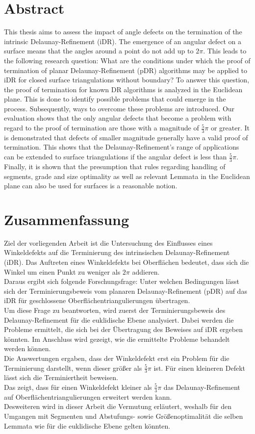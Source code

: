 \chapter*{Abstract}
This thesis aims to assess the impact of angle defects on the termination of the intrinsic Delaunay-Refinement (iDR). The emergence of an angular defect on a surface means that the angles around a point do not add up to $2\pi$. This leads to the following research question: What are the conditions under which the proof of termination of planar Delaunay-Refinement (pDR) algorithms may be applied to iDR for closed surface triangulations without boundary? To answer this question, the proof of termination for known DR algorithms is analyzed in the Euclidean plane. This is done to identify possible problems that could emerge in the process. Subsequently, ways to overcome these problems are introduced. Our evaluation shows that the only angular defects that become a problem with regard to the proof of termination are those with a magnitude of $\frac{5}{3}\pi$ or greater. It is demonstrated that defects of smaller magnitude generally have a valid proof of termination. This shows that the Delaunay-Refinement’s range of applications can be extended to surface triangulations if the angular defect is less than $\frac{5}{3}\pi$. Finally, it is shown that the presumption that rules regarding handling of segments, grade and size optimality as well as relevant Lemmata in the Euclidean plane can also be used for surfaces is a reasonable notion.

\chapter*{Zusammenfassung}
Ziel der vorliegenden Arbeit ist die Untersuchung des Einflusses eines Winkeldefekts auf die Terminierung des intrinsischen Delaunay-Refinement (iDR).  Das Auftreten eines Winkeldefekts bei Oberflächen bedeutet, dass sich die Winkel um einen Punkt zu weniger als  $2\pi$ addieren. \\
    Daraus ergibt sich folgende Forschungsfrage: Unter welchen Bedingungen lässt sich der Terminierungsbeweis vom planaren Delaunay-Refinement (pDR)  auf das iDR für geschlossene Oberflächentriangulierungen  übertragen.\\
    Um diese Frage zu beantworten, wird zuerst der Terminierungsbeweis des Delaunay-Refinement für die euklidische Ebene analysiert. Dabei werden die Probleme ermittelt, die sich bei der Übertragung des Beweises auf iDR ergeben könnten.
 Im Anschluss wird gezeigt, wie die ermittelte Probleme behandelt werden können.\\
    Die Auswertungen ergaben, dass der Winkeldefekt erst ein Problem für die Terminierung darstellt, wenn dieser größer als $\frac{5}{3}\pi$  ist. Für einen kleineren Defekt lässt sich die Terminiertheit beweisen.\\
    Das zeigt, dass für einen Winkeldefekt kleiner als $\frac{5}{3} \pi$ das Delaunay-Refinement auf Oberflächentriangulierungen erweitert werden kann.\\
    Desweiteren wird in dieser Arbeit die Vermutung erläutert, weshalb für den Umgangen mit Segmenten und Abstufungs- sowie Größenoptimalität die selben Lemmata wie für die euklidische Ebene gelten könnten.